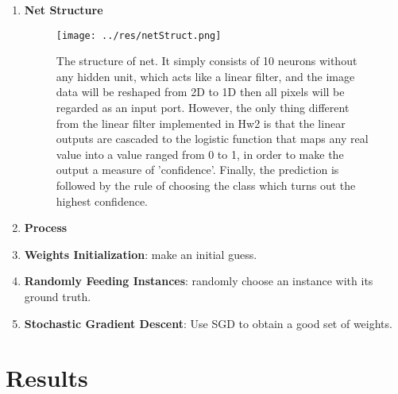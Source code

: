 \documentclass[12pt]{article}
\makeatletter
\renewenvironment{itemize}
{\list{$\bullet$}{\leftmargin\z@ \labelwidth\z@ \itemindent-\leftmargin
\let\makelabel\descriptionlabel}}
{\endlist}
\makeatother
\begin{document}
\begin{enumerate}
	\item {\bf Net Structure}
	\begin{SCfigure}[][h]
		\hspace*{-2em}
		\texttt{[image: ../res/netStruct.png]}
		\caption{The structure of net. It simply consists of 10 neurons without any hidden unit, which acts like a linear filter, and the image data will be reshaped from 2D to 1D then all pixels will be regarded as an input port. However, the only thing different from the linear filter implemented in Hw2 is that the linear outputs are cascaded to the logistic function that maps any real value into a value ranged from 0 to 1, in order to make the output a measure of 'confidence'. Finally, the prediction is followed by the rule of choosing the class which turns out the highest confidence.}
	\end{SCfigure}
	
	\newpage
	\item {\bf Process}
	\begin{itemize}
		\item {\bf Weights Initialization}: make an initial guess.
		\item {\bf Randomly Feeding Instances}: randomly choose an instance with its ground truth.
		\item {\bf Stochastic Gradient Descent}: Use SGD to obtain a good set of weights.
	\end{itemize}
\end{enumerate}

\section*{Results}
\vspace{-20pt}
\noindent\makebox[\linewidth]{\rule{\textwidth}{0.4pt}}
\end{document}
